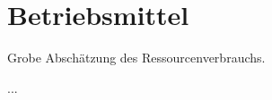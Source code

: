 %
%


\chapter{Betriebsmittel}
\label{Betriebsmittel}

Grobe Abschätzung des Ressourcenverbrauchs.


...
\\


